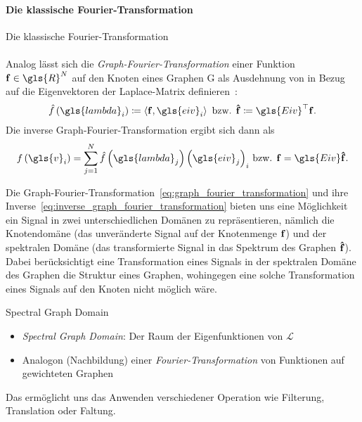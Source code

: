 \paragraph{Die klassische Fourier-Transformation}
\label{fourier_transformation}
Die klassische Fourier-Transformation
\\\\
Analog lässt sich die \emph{Graph-Fourier-Transformation} einer Funktion $\ve{f} \in \gls{R}^N$ auf den Knoten eines Graphen \gls{G} als Ausdehnung von  in Bezug auf die Eigenvektoren der Laplace-Matrix definieren~\cite{Shuman}:
\begin{equation}
  \hat f\left(\gls{lambda}_i\right) \coloneqq \left\langle \ve{f}, \gls{eiv}_i \right\rangle \text{ \bzw{} } \ve{\hat f} \coloneqq \gls{Eiv}^{\top}\ve{f}.
  \label{eq:graph_fourier_transformation}
\end{equation}
Die inverse Graph-Fourier-Transformation ergibt sich dann als~\cite{Shuman}
\begin{equation}
  f\left(\gls{v}_i\right) = \sum_{j=1}^N \hat f\left(\gls{lambda}_j\right) {\left(\gls{eiv}_j\right)}_i\text{ \bzw{} }\ve{f} = \gls{Eiv}\ve{\hat f}.
  \label{eq:inverse_graph_fourier_transformation}
\end{equation}

Die Graph-Fourier-Transformation~\eqref{eq:graph_fourier_transformation} und ihre Inverse~\eqref{eq:inverse_graph_fourier_transformation} bieten uns eine Möglichkeit ein Signal in zwei unterschiedlichen Domänen zu repräsentieren, nämlich die Knotendomäne (das unveränderte Signal auf der Knotenmenge $\mathbf{f}$) und der spektralen Domäne (das transformierte Signal in das Spektrum des Graphen $\mathbf{\hat f}$).
Dabei berücksichtigt eine Transformation eines Signals in der spektralen Domäne des Graphen die Struktur eines Graphen, wohingegen eine solche Transformation eines Signals auf den Knoten nicht möglich wäre.


Spectral Graph Domain

\begin{itemize}
  \item \emph{Spectral Graph Domain}: Der Raum der Eigenfunktionen von $\mathcal{L}$
  \item Analogon (Nachbildung) einer \emph{Fourier-Transformation} von Funktionen auf gewichteten Graphen
\end{itemize}

Das ermöglicht uns das Anwenden verschiedener Operation wie Filterung, Translation oder Faltung.

